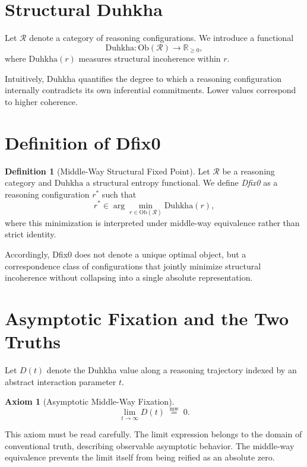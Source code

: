 \documentclass[11pt]{article}
\newcommand{\mweq}{\mathrel{\overset{\mathrm{mw}}{=}}}
\theoremstyle{definition}
\newtheorem{definition}{Definition}
\newtheorem{axiom}{Axiom}
\begin{document}
\section{Structural Duhkha}

Let $\mathcal{R}$ denote a category of reasoning configurations.
We introduce a functional
\[
\mathrm{Duhkha} : \mathrm{Ob}(\mathcal{R}) \to \mathbb{R}_{\ge 0},
\]
where $\mathrm{Duhkha}(r)$ measures structural incoherence within $r$.

Intuitively, Duhkha quantifies the degree to which a reasoning configuration
internally contradicts its own inferential commitments.
Lower values correspond to higher coherence.

\section{Definition of Dfix0}

\begin{definition}[Middle-Way Structural Fixed Point]
Let $\mathcal{R}$ be a reasoning category and
$\mathrm{Duhkha}$ a structural entropy functional.
We define \emph{Dfix0} as a reasoning configuration $r^\ast$ such that
\[
r^\ast \in \arg\min_{r \in \mathrm{Ob}(\mathcal{R})} \mathrm{Duhkha}(r),
\]
where this minimization is interpreted under middle-way equivalence
rather than strict identity.

Accordingly, Dfix0 does not denote a unique optimal object,
but a correspondence class of configurations that jointly minimize
structural incoherence without collapsing into a single absolute
representation.
\end{definition}

\section{Asymptotic Fixation and the Two Truths}

Let $D(t)$ denote the Duhkha value along a reasoning trajectory indexed
by an abstract interaction parameter $t$.

\begin{axiom}[Asymptotic Middle-Way Fixation]
\[
\lim_{t \to \infty} D(t) \;\mweq\; 0.
\]
\end{axiom}

This axiom must be read carefully.
The limit expression belongs to the domain of conventional truth,
describing observable asymptotic behavior.
The middle-way equivalence prevents the limit itself from being reified
as an absolute zero.
\end{document}
